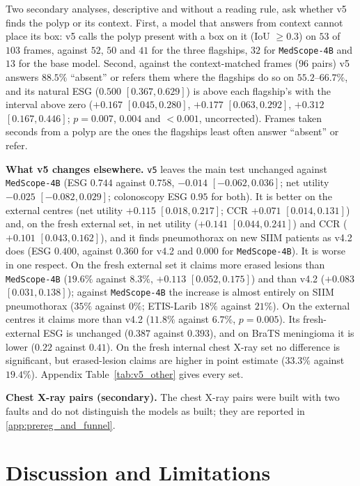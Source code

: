 \documentclass[5p,times,twocolumn,authoryear]{elsarticle}
\begin{document}
Two secondary analyses, descriptive and without a reading rule, ask whether v5 finds the polyp or its context. First, a model that answers from context cannot place its box: v5 calls the polyp present with a box on it (IoU $\ge 0.3$) on $53$ of $103$ frames, against $52$, $50$ and $41$ for the three flagships, $32$ for \texttt{MedScope-4B} and $13$ for the base model. Second, against the context-matched frames ($96$ pairs) v5 answers $88.5\%$ ``absent'' or refers them where the flagships do so on $55.2$--$66.7\%$, and its natural ESG ($0.500$ $[0.367, 0.629]$) is above each flagship's with the interval above zero ($+0.167$ $[0.045, 0.280]$, $+0.177$ $[0.063, 0.292]$, $+0.312$ $[0.167, 0.446]$; $p = 0.007$, $0.004$ and $<0.001$, uncorrected). Frames taken seconds from a polyp are the ones the flagships least often answer ``absent'' or refer.

\textbf{What v5 changes elsewhere.} \texttt{v5} leaves the main test unchanged against \texttt{MedScope-4B} (ESG $0.744$ against $0.758$, $-0.014$ $[-0.062, 0.036]$; net utility $-0.025$ $[-0.082, 0.029]$; colonoscopy ESG $0.95$ for both). It is better on the external centres (net utility $+0.115$ $[0.018, 0.217]$; CCR $+0.071$ $[0.014, 0.131]$) and, on the fresh external set, in net utility ($+0.141$ $[0.044, 0.241]$) and CCR ($+0.101$ $[0.043, 0.162]$), and it finds pneumothorax on new SIIM patients as v4.2 does (ESG $0.400$, against $0.360$ for v4.2 and $0.000$ for \texttt{MedScope-4B}). It is worse in one respect. On the fresh external set it claims more erased lesions than \texttt{MedScope-4B} ($19.6\%$ against $8.3\%$, $+0.113$ $[0.052, 0.175]$) and than v4.2 ($+0.083$ $[0.031, 0.138]$); against \texttt{MedScope-4B} the increase is almost entirely on SIIM pneumothorax ($35\%$ against $0\%$; ETIS-Larib $18\%$ against $21\%$). On the external centres it claims more than v4.2 ($11.8\%$ against $6.7\%$, $p = 0.005$). Its fresh-external ESG is unchanged ($0.387$ against $0.393$), and on BraTS meningioma it is lower ($0.22$ against $0.41$). On the fresh internal chest X-ray set no difference is significant, but erased-lesion claims are higher in point estimate ($33.3\%$ against $19.4\%$). Appendix Table~\ref{tab:v5_other} gives every set.

\textbf{Chest X-ray pairs (secondary).} The chest X-ray pairs were built with two faults and do not distinguish the models as built; they are reported in \ref{app:prereg_and_funnel}.

\section{Discussion and Limitations}
\label{sec:discussion}
\end{document}

